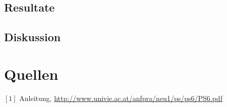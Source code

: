 \documentclass[12pt,a4paper]{article}
\begin{document}
\begin{multicols}{2}
\subsection{Resultate}

\subsection{Diskussion}




\section{Quellen}
$[1]$ Anleitung, \url{http://www.univie.ac.at/anfpra/neu1/ps/ps6/PS6.pdf}\\

\end{multicols}
\end{document}
